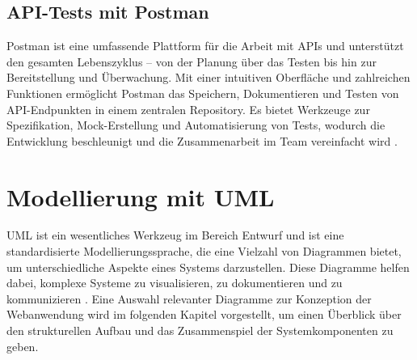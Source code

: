 \subsection{API-Tests mit Postman}

Postman ist eine umfassende Plattform für die Arbeit mit APIs und unterstützt den gesamten Lebenszyklus – von der Planung über das Testen bis hin zur Bereitstellung und Überwachung. Mit einer intuitiven Oberfläche und zahlreichen Funktionen ermöglicht Postman das Speichern, Dokumentieren und Testen von API-Endpunkten in einem zentralen Repository. Es bietet Werkzeuge zur Spezifikation, Mock-Erstellung und Automatisierung von Tests, wodurch die Entwicklung beschleunigt und die Zusammenarbeit im Team vereinfacht wird \cite{POSTMAN2025}.

\section{Modellierung mit UML}

UML ist ein wesentliches Werkzeug im Bereich Entwurf und ist eine standardisierte Modellierungssprache, die eine Vielzahl von Diagrammen bietet, um unterschiedliche Aspekte eines Systems darzustellen. Diese Diagramme helfen dabei, komplexe Systeme zu visualisieren, zu dokumentieren und zu kommunizieren \cite{UML2025}. Eine Auswahl relevanter Diagramme zur Konzeption der Webanwendung wird im folgenden Kapitel vorgestellt, um einen Überblick über den strukturellen Aufbau und das Zusammenspiel der Systemkomponenten zu geben.


                                                                                                                                                                                                                                                                                        